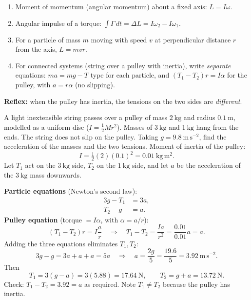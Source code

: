 \documentclass[11pt]{article}
\begin{document}
\begin{methode}
\begin{enumerate}
\item Moment of momentum (angular momentum) about a fixed axis: $L=I\omega$.
\item Angular impulse of a torque: $\displaystyle \int \Gamma\,dt=\Delta L=I\omega_2-I\omega_1$.
\item For a particle of mass $m$ moving with speed $v$ at perpendicular distance $r$ from the axis, $L=mvr$.
\item For connected systems (string over a pulley with inertia), write \emph{separate} equations: $ma=mg-T$ type for each particle, and $(T_1-T_2)r=I\alpha$ for the pulley, with $a=r\alpha$ (no slipping).
\end{enumerate}
\textbf{Reflex:} when the pulley has inertia, the tensions on the two sides are \emph{different}.
\end{methode}

\begin{exoresolu}
A light inextensible string passes over a pulley of mass $2\ \mathrm{kg}$ and radius $0.1\ \mathrm{m}$, modelled as a uniform disc ($I=\tfrac12 Mr^2$). Masses of $3\ \mathrm{kg}$ and $1\ \mathrm{kg}$ hang from the ends. The string does not slip on the pulley. Taking $g=9.8\ \mathrm{m\,s^{-2}}$, find the acceleration of the masses and the two tensions.
\tcblower
Moment of inertia of the pulley:
\[
I=\tfrac12(2)(0.1)^2=0.01\ \mathrm{kg\,m^2}.
\]
Let $T_1$ act on the $3\ \mathrm{kg}$ side, $T_2$ on the $1\ \mathrm{kg}$ side, and let $a$ be the acceleration of the $3\ \mathrm{kg}$ mass downwards.

\textbf{Particle equations} (Newton's second law):
\begin{align*}
3g-T_1&=3a,\\
T_2-g&=a.
\end{align*}
\textbf{Pulley equation} (torque $=I\alpha$, with $\alpha=a/r$):
\[
(T_1-T_2)r=I\frac{a}{r}
\quad\Longrightarrow\quad
T_1-T_2=\frac{Ia}{r^2}=\frac{0.01}{0.01}a=a.
\]
Adding the three equations eliminates $T_1,T_2$:
\[
3g-g=3a+a+a=5a
\quad\Longrightarrow\quad
a=\frac{2g}{5}=\frac{19.6}{5}=\boxed{3.92\ \mathrm{m\,s^{-2}}}.
\]
Then
\[
T_1=3(g-a)=3(5.88)=\boxed{17.64\ \mathrm{N}},\qquad
T_2=g+a=13.72\ \mathrm{N}.
\]
Check: $T_1-T_2=3.92=a$ as required. Note $T_1\neq T_2$ because the pulley has inertia.
\end{exoresolu}
\end{document}
